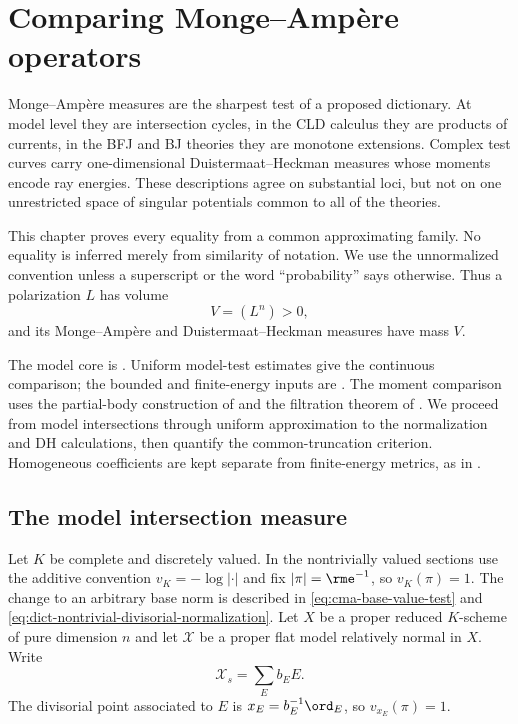\chapter{Comparing Monge--Amp\`ere operators}
\label{chap:compare-ma}

Monge--Amp\`ere measures are the sharpest test of a proposed dictionary.
At model level they are intersection cycles, in the CLD calculus they are
products of currents, in the BFJ and BJ theories they are monotone
extensions. Complex test curves carry one-dimensional
Duistermaat--Heckman measures whose moments encode ray energies.
These descriptions agree on substantial loci, but not on one unrestricted
space of singular potentials common to all of the theories.

This chapter proves every equality from a common approximating family.
No equality is inferred merely from similarity of notation.
We use the unnormalized convention unless a superscript or the word
``probability'' says otherwise.
Thus a polarization $L$ has volume
\[
                         V=(L^n)>0,
\tag{64.1}\label{eq:cma-volume}
\]
and its Monge--Amp\`ere and Duistermaat--Heckman measures have mass $V$.

The model core is .
Uniform model-test estimates give the continuous comparison; the bounded
and finite-energy inputs are .
The moment comparison uses the partial-body construction of
 and the filtration theorem of
. We proceed from model intersections through
uniform approximation to the normalization and DH calculations, then
quantify the common-truncation criterion. Homogeneous coefficients are
kept separate from finite-energy metrics, as in
.

\section{The model intersection measure}
\label{sec:cma-model}

Let $K$ be complete and discretely valued. In the nontrivially valued
sections use the additive convention $v_K=-\log|\cdot|$ and fix
$|\pi|=\rme^{-1}$, so $v_K(\pi)=1$. The change to an arbitrary
base norm is described in \eqref{eq:cma-base-value-test} and
\eqref{eq:dict-nontrivial-divisorial-normalization}.
Let $X$ be a proper reduced $K$-scheme of pure dimension $n$ and let
$\mathcal X$ be a proper flat model relatively normal in $X$.
Write
\[
                         \mathcal X_s=\sum_E b_EE.
\tag{64.2}\label{eq:cma-special-fibre}
\]
The divisorial point associated to $E$ is
$x_E=b_E^{-1}\ord_E$, so $v_{x_E}(\pi)=1$.

